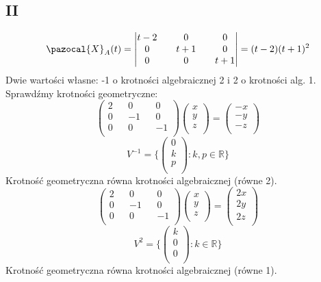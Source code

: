 \documentclass{article}
\begin{document}
\subsection*{II}
$$\pazocal{X}_A(t) =
\begin{vmatrix}
t-2 && 0 && 0\\
0 && t+1 && 0\\
0 && 0 && t+1\\
\end{vmatrix} =
(t-2)(t+1)^2
$$
Dwie wartości własne: -1 o krotności algebraicznej 2 i 2 o krotności alg. 1. Sprawdźmy krotności geometryczne:
$$
\begin{pmatrix}
2 && 0 && 0\\
0 && -1 && 0\\
0 && 0 && -1\\
\end{pmatrix}
\begin{pmatrix}
x\\
y\\
z\\
\end{pmatrix} =
\begin{pmatrix}
-x\\
-y\\
-z\\
\end{pmatrix}
$$
$$
V^{-1} = \{\begin{pmatrix}
0\\
k\\
p\\
\end{pmatrix} : k,p \in \mathbb{R}\}
$$
Krotność geometryczna równa krotności algebraicznej (równe 2).
$$
\begin{pmatrix}
2 && 0 && 0\\
0 && -1 && 0\\
0 && 0 && -1\\
\end{pmatrix}
\begin{pmatrix}
x\\
y\\
z\\
\end{pmatrix} =
\begin{pmatrix}
2x\\
2y\\
2z\\
\end{pmatrix}
$$
$$
V^{2} = \{\begin{pmatrix}
k\\
0\\
0\\
\end{pmatrix} : k \in \mathbb{R}\}
$$
Krotność geometryczna równa krotności algebraicznej (równe 1).
\end{document}
